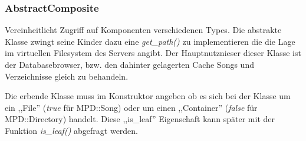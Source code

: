 

\subsubsection{AbstractComposite}
Vereinheitlicht Zugriff auf Komponenten verschiedenen Types.
Die abstrakte Klasse zwingt seine Kinder dazu eine \emph{get\_path()} zu implementieren die die Lage im virtuellen Filesystem des Servers angibt.
Der Hauptnutznieser dieser Klasse ist der Databasebrowser, bzw. den dahinter gelagerten Cache Songs und Verzeichnisse gleich zu behandeln.

Die erbende Klasse muss im Konstruktor angeben ob es sich bei der Klasse um ein ,,File'' (\emph{true} für MPD::Song) oder um einen ,,Container'' (\emph{false} für MPD::Directory) handelt.
Diese ,,is\_leaf'' Eigenschaft kann später mit der Funktion \emph{is\_leaf()} abgefragt werden.



